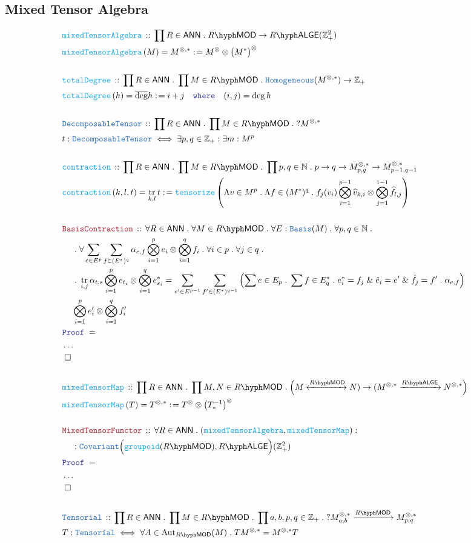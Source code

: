 \documentclass[12pt]{scrartcl}%
\newcommand{\TYPE}[1]{\textcolor{NavyBlue}{\mathtt{#1}}}%
\newcommand{\FUNC}[1]{\textcolor{Cerulean}{\mathtt{#1}}}%
\newcommand{\LOGIC}[1]{\textcolor{Blue}{\mathtt{#1}}}%
\newcommand{\THM}[1]{\textcolor{Maroon}{\mathtt{#1}}}%
\renewcommand{\.}{\; . \;} %
\newcommand{\de}{: \kern 0.1pc =} %
\newcommand{\where}{\LOGIC{where}} %
\newcommand{\Act}[1]{\left( #1 \right)} %
\newcommand{\Theorem}[2]{& \THM{#1} \, :: \, #2 \\ & \Proof = \\ } %
\newcommand{\DeclareType}[2]{& \TYPE{#1} \, :: \, #2 \\}%
\newcommand{\DefineType}[3]{& #1 : \TYPE{#2} \iff #3 \\}%
\newcommand{\DeclareFunc}[2]{& \FUNC{#1} \, :: \, #2 \\}%
\newcommand{\DefineNamedFunc}[4]{&  \FUNC{#1}\Act{#2} = #3 \de #4 \\}%
\newcommand{\NewLine}{\\ & \kern 1pc}%
\newcommand{\Page}[1]{ \begin{align*} #1 \end{align*}  }%
\newcommand{\NoProof}{ & \ldots \\ \EndProof}%
\renewcommand{\And}{\; \& \;}%
\newcommand{\Int}{\mathbb{Z}}%
\newcommand{\Nat}{\mathbb{N}}%
\newcommand{\Aut}{\mathrm{Aut}}%
\newcommand{\QED}{\; \square} %
\newcommand{\EndProof}{& \QED \\} %
\newcommand{\Proof}{\LOGIC{Proof} \; } %
\newcommand{\Arrow}[1]{\xrightarrow{#1}}%
\newcommand{\ToIso}[1]{\xleftrightarrow{#1}}%
\newcommand{\Cov}{\TYPE{Covariant}}%
\DeclareMathOperator{\tr}{tr}     %
\newcommand{\LMOD}[1]{#1\hyph\mathsf{MOD}} %
\newcommand{\ANN}{\mathsf{ANN}} %
\newcommand{\LALGE}[1]{#1\hyph\mathsf{ALGE}}%
\begin{document}
\subsection{Mixed Tensor Algebra}
\Page{
	\DeclareFunc{mixedTensorAlgebra}{\prod R \in \ANN \. \LMOD{R} \to \LALGE{R}(\Int^2_+) }
	\DefineNamedFunc{mixedTensorAlgebra}{M}{M^{\otimes,*}}{M^\otimes \otimes \big(M^*\big)^\otimes}
	\\
	\DeclareFunc{totalDegree}{ \prod R \in \ANN \. \prod M \in \LMOD{R} \. \TYPE{Homogeneous}(M^{\otimes,*}) \to \Int_+}
	\DefineNamedFunc{totalDegree}{h}{\overline{\deg} h}{i + j \quad \where \quad (i,j) = \deg h}
	\\
	\DeclareType{DecomposableTensor}{\prod R \in \ANN \. \prod M \in \LMOD{R} \. ?M^{\otimes,*}}
	\DefineType{t}{DecomposableTensor}{\exists p,q \in \Int_+ : \exists m : M^p} 
	\\
	\DeclareFunc{contraction}{\prod R \in \ANN \. \prod M \in \LMOD{R} \. \prod p,q \in \Nat \. p \to q \to M^{\otimes,*}_{p,q} \to M^{\otimes,*}_{p-1,q-1} }
	\DefineNamedFunc{contraction}{k,l, t}{\tr_{k,l} t}{ \FUNC{tensorize}\left(\Lambda  v \in M^p \. \Lambda f \in (M^*)^q  \. 
		f_j(v_i)\bigotimes^{p-1}_{i=1} \widehat{v}_{k,i}   \otimes \bigotimes^{1-1}_{j=1} \widehat{f}_{l,j} \right)  }
	\\
	\Theorem{BasisContraction}{
			\forall R \in \ANN \. 
			\forall M \in \LMOD{R} \. 
			\forall E : \TYPE{Basis}(M) \. 
			\forall p,q \in \Nat \. \NewLine \. 
			\forall \sum_{e \in E^p} \sum_{f \in (E^*)^q} \alpha_{e,f} \bigotimes^p_{i=1} e_{i} \otimes \bigotimes^q_{i=1} f_{i} \.
			\forall i \in p \.
			\forall j \in q \. \NewLine \. 
			\tr_{i,j} \alpha_{t,s} \bigotimes^p_{i=1} e_{t_i} \otimes \bigotimes^q_{i=1} e^*_{s_i} =
			\sum_{e' \in E^{p-1}} \sum_{f' \in (E^*)^{q-1}} \left( \sum e \in E_p \. \sum f \in E^*_q \. e_i^* = f_j \And \hat{e}_i = e' \And \hat{f}_j = f' \. \alpha_{e,f} \right)                    
		 	\NewLine  \bigotimes^p_{i=1} e_{i}' \otimes \bigotimes^q_{i=1} f_{i}' 
		}
	\NoProof
	\\
	\DeclareFunc{mixedTensorMap}{\prod R \in \ANN \. \prod M,N \in \LMOD{R} \. \Big(M \ToIso{\LMOD{R}} N) \to (M^{\otimes,*} \Arrow{ \LALGE{R}} N^{\otimes,*}\Big)}
	\DefineNamedFunc{mixedTensorMap}{T}{T^{\otimes,*}}{ T^\otimes \otimes \big(T_*^{-1}\big)^\otimes  }
	\\
	\Theorem{MixedTensorFunctor}{\forall R \in \ANN \. (\FUNC{mixedTensorAlgebra},\FUNC{mixedTensorMap}) :  
		\NewLine : \Cov\Big( \FUNC{groupoid}(\LMOD{R}),\LALGE{R}\Big)(\Int_+^2) }
	\NoProof
	\\
	\DeclareType{Tensorial}{\prod R \in \ANN \. \prod M \in \LMOD{R} \.  \prod a,b,p,q \in \Int_+ \. ? M^{\otimes,*}_{a,b} \Arrow{\LMOD{R}} M^{\otimes,*}_{p,q}}
	\DefineType{T}{Tensorial}{\forall A \in \Aut_{\LMOD{R}}(M) \. TM^{\otimes,*} = M^{\otimes,*}T}
}
\newpage
\end{document}
